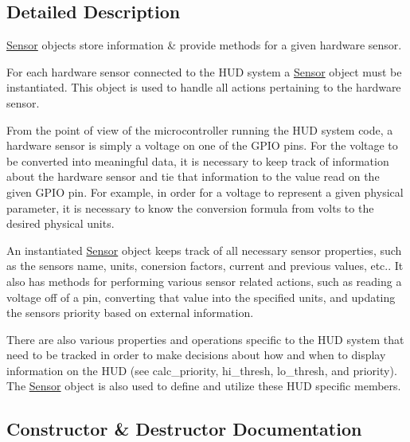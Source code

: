 \subsection{Detailed Description}
\hyperlink{classSensor}{Sensor} objects store information \& provide methods for a given hardware sensor. 

For each hardware sensor connected to the H\+UD system a \hyperlink{classSensor}{Sensor} object must be instantiated. This object is used to handle all actions pertaining to the hardware sensor.

From the point of view of the microcontroller running the H\+UD system code, a hardware sensor is simply a voltage on one of the G\+P\+IO pins. For the voltage to be converted into meaningful data, it is necessary to keep track of information about the hardware sensor and tie that information to the value read on the given G\+P\+IO pin. For example, in order for a voltage to represent a given physical parameter, it is necessary to know the conversion formula from volts to the desired physical units.

An instantiated \hyperlink{classSensor}{Sensor} object keeps track of all necessary sensor properties, such as the sensor\textquotesingle{}s name, units, conersion factors, current and previous values, etc.. It also has methods for performing various sensor related actions, such as reading a voltage off of a pin, converting that value into the specified units, and updating the sensors priority based on external information.

There are also various properties and operations specific to the H\+UD system that need to be tracked in order to make decisions about how and when to display information on the H\+UD (see calc\+\_\+priority, hi\+\_\+thresh, lo\+\_\+thresh, and priority). The \hyperlink{classSensor}{Sensor} object is also used to define and utilize these H\+UD specific members. 

\subsection{Constructor \& Destructor Documentation}
